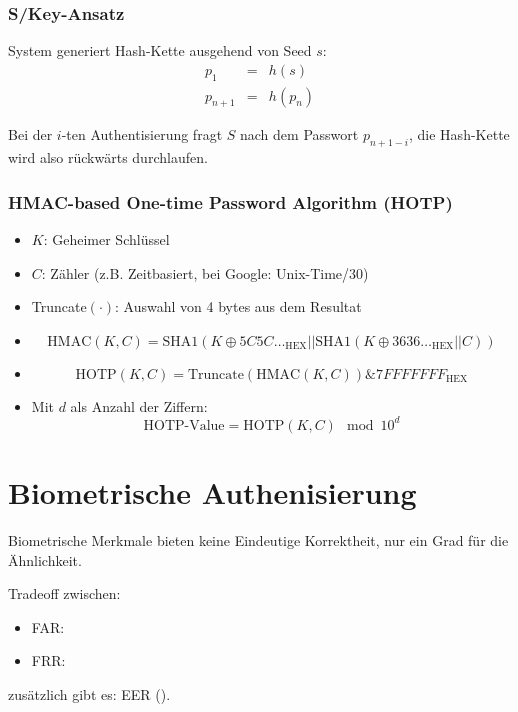 \subsubsection{S/Key-Ansatz}
System generiert Hash-Kette ausgehend von Seed $s$:
\begin{eqnarray*}
    p_1 &=& h(s) \\
    p_{n+1} &=& h(p_n)
\end{eqnarray*}

Bei der $i$-ten Authentisierung fragt $S$ nach dem Passwort $p_{n+1-i}$, die Hash-Kette wird also rückwärts durchlaufen.

\subsubsection{HMAC-based One-time Password Algorithm (HOTP)}
\begin{itemize}
    \item $K$: Geheimer Schlüssel
    \item $C$: Zähler (z.B. Zeitbasiert, bei Google: Unix-Time/30)
    \item Truncate$(\cdot)$: Auswahl von 4 bytes aus dem Resultat
    \item
        \begin{equation*}
            \text{HMAC}(K, C) = \text{SHA1}\left(K \oplus {5C5C\ldots}_\text{HEX} || 
                 \text{SHA1}\left(K \oplus {3636\ldots}_\text{HEX} || C\right)\right)
        \end{equation*}
    \item
        \begin{equation*}
            \text{HOTP}(K, C) = \text{Truncate}\left(\text{HMAC}(K, C)\right) \&
                {7FFFFFFF}_\text{HEX}
        \end{equation*}
    \item Mit $d$ als Anzahl der Ziffern:
        \begin{equation*}
            \text{HOTP-Value} = \text{HOTP}(K, C) \mod 10^d
        \end{equation*}
\end{itemize}

\section{Biometrische Authenisierung}
Biometrische Merkmale bieten keine Eindeutige Korrektheit, nur ein Grad für die Ähnlichkeit.

Tradeoff zwischen:
\begin{itemize}
    \item FAR: 
    \item FRR: 
\end{itemize}
zusätzlich gibt es: EER ().

